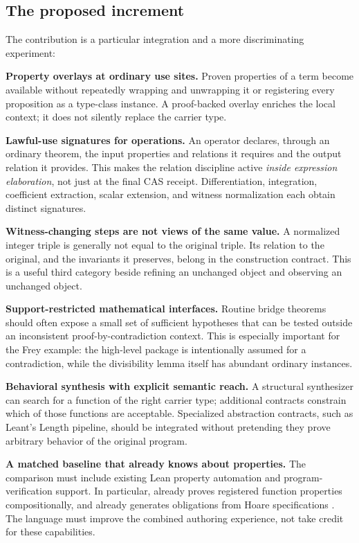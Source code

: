 \documentclass[11pt,a4paper]{article}
\newcommand{\code}[1]{\texttt{\detokenize{#1}}}
\theoremstyle{plain}\newtheorem{proposition}{Proposition}[section]
\theoremstyle{definition}\newtheorem{definition}[proposition]{Definition}
\theoremstyle{remark}\newtheorem{remark}[proposition]{Remark}
\begin{document}
\subsection{The proposed increment}
The contribution is a particular integration and a more discriminating experiment:

\textbf{Property overlays at ordinary use sites.} Proven properties of a term become available without repeatedly wrapping and unwrapping it or registering every proposition as a type-class instance. A proof-backed overlay enriches the local context; it does not silently replace the carrier type.

\textbf{Lawful-use signatures for operations.} An operator declares, through an ordinary theorem, the input properties and relations it requires and the output relation it provides. This makes the relation discipline active \emph{inside expression elaboration}, not just at the final CAS receipt. Differentiation, integration, coefficient extraction, scalar extension, and witness normalization each obtain distinct signatures.

\textbf{Witness-changing steps are not views of the same value.} A normalized integer triple is generally not equal to the original triple. Its relation to the original, and the invariants it preserves, belong in the construction contract. This is a useful third category beside refining an unchanged object and observing an unchanged object.

\textbf{Support-restricted mathematical interfaces.} Routine bridge theorems should often expose a small set of sufficient hypotheses that can be tested outside an inconsistent proof-by-contradiction context. This is especially important for the Frey example: the high-level package is intentionally assumed for a contradiction, while the divisibility lemma itself has abundant ordinary instances.

\textbf{Behavioral synthesis with explicit semantic reach.} A structural synthesizer can search for a function of the right carrier type; additional contracts constrain which of those functions are acceptable. Specialized abstraction contracts, such as Leant's Length pipeline, should be integrated without pretending they prove arbitrary behavior of the original program.

\textbf{A matched baseline that already knows about properties.} The comparison must include existing Lean property automation and program-verification support. In particular, \code{fun_prop} already proves registered function properties compositionally, and \code{mvcgen} already generates obligations from Hoare specifications \cite{funprop,mvcgen}. The language must improve the combined authoring experience, not take credit for these capabilities.
\end{document}
